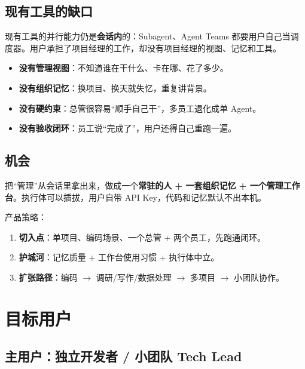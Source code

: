 \documentclass[UTF8,11pt,a4paper,fontset=windows]{ctexart}
\let\ocsection\section
\renewcommand{\section}{\Needspace{8\baselineskip}\ocsection}
\let\ocsubsection\subsection
\renewcommand{\subsection}{\Needspace{5\baselineskip}\ocsubsection}
\begin{document}
\subsection{现有工具的缺口}

现有工具的并行能力仍是\textbf{会话内}的：Subagent、Agent Teams 都要用户自己当调度器。用户承担了项目经理的工作，却没有项目经理的视图、记忆和工具。

\begin{itemize}
  \item \textbf{没有管理视图}：不知道谁在干什么、卡在哪、花了多少。
  \item \textbf{没有组织记忆}：换项目、换天就失忆，重复讲背景。
  \item \textbf{没有硬约束}：总管很容易“顺手自己干”，多员工退化成单 Agent。
  \item \textbf{没有验收闭环}：员工说“完成了”，用户还得自己重跑一遍。
\end{itemize}

\subsection{机会}

把“管理”从会话里拿出来，做成一个\textbf{常驻的人 + 一套组织记忆 + 一个管理工作台}。执行体可以插拔，用户自带 API Key，代码和记忆默认不出本机。

产品策略：

\begin{enumerate}
  \item \textbf{切入点}：单项目、编码场景、一个总管 + 两个员工，先跑通闭环。
  \item \textbf{护城河}：记忆质量 + 工作台使用习惯 + 执行体中立。
  \item \textbf{扩张路径}：编码 $\rightarrow$ 调研/写作/数据处理 $\rightarrow$ 多项目 $\rightarrow$ 小团队协作。
\end{enumerate}

\section{目标用户}
\label{sec:users}

\subsection{主用户：独立开发者 / 小团队 Tech Lead}
\end{document}
